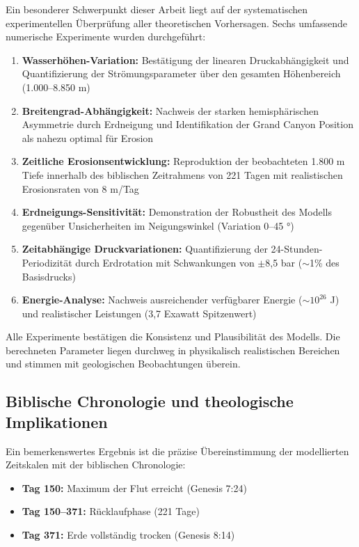 ﻿\documentclass[12pt,a4paper]{report}
\begin{document}
Ein besonderer Schwerpunkt dieser Arbeit liegt auf der systematischen experimentellen Überprüfung aller theoretischen Vorhersagen. Sechs umfassende numerische Experimente wurden durchgeführt:

\begin{enumerate}
	\item \textbf{Wasserhöhen-Variation:} Bestätigung der linearen Druckabhängigkeit und Quantifizierung der Strömungsparameter über den gesamten Höhenbereich (1.000--8.850 m)
	
	\item \textbf{Breitengrad-Abhängigkeit:} Nachweis der starken hemisphärischen Asymmetrie durch Erdneigung und Identifikation der Grand Canyon Position als nahezu optimal für Erosion
	
	\item \textbf{Zeitliche Erosionsentwicklung:} Reproduktion der beobachteten 1.800 m Tiefe innerhalb des biblischen Zeitrahmens von 221 Tagen mit realistischen Erosionsraten von 8 m/Tag
	
	\item \textbf{Erdneigungs-Sensitivität:} Demonstration der Robustheit des Modells gegenüber Unsicherheiten im Neigungswinkel (Variation 0--45 °)
	
	\item \textbf{Zeitabhängige Druckvariationen:} Quantifizierung der 24-Stunden-Periodizität durch Erdrotation mit Schwankungen von $\pm$8,5 bar ($\sim$1\% des Basisdrucks)
	
	\item \textbf{Energie-Analyse:} Nachweis ausreichender verfügbarer Energie ($\sim 10^{26}$ J) und realistischer Leistungen (3,7 Exawatt Spitzenwert)
\end{enumerate}

Alle Experimente bestätigen die Konsistenz und Plausibilität des Modells. Die berechneten Parameter liegen durchweg in physikalisch realistischen Bereichen und stimmen mit geologischen Beobachtungen überein.

\subsection{Biblische Chronologie und theologische Implikationen}

Ein bemerkenswertes Ergebnis ist die präzise Übereinstimmung der modellierten Zeitskalen mit der biblischen Chronologie:

\begin{itemize}
	\item \textbf{Tag 150:} Maximum der Flut erreicht (Genesis 7:24)
	\item \textbf{Tag 150--371:} Rücklaufphase (221 Tage)
	\item \textbf{Tag 371:} Erde vollständig trocken (Genesis 8:14)
\end{itemize}
\end{document}
